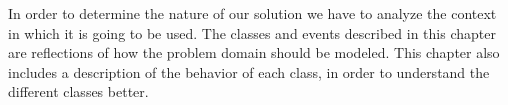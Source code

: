 In order to determine the nature of our solution we have to analyze the context in which it is going to be used.
The classes and events described in this chapter are reflections of how the problem domain should be modeled. This chapter also includes a description of the behavior of each class, in order to understand the different classes better.







